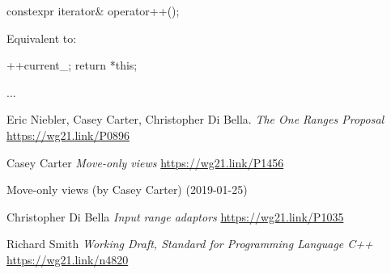 \documentclass{wg21}
\begin{document}
\begin{itemdecl}
	constexpr iterator& operator++();
\end{itemdecl}

\begin{itemdescr}
	\pnum
	\effects Equivalent to:
	\begin{codeblock}
		++current_;
		return *this;
	\end{codeblock}
\end{itemdescr}

...


\begin{thebibliography}{9}
	

	Eric Niebler, Casey Carter, Christopher Di Bella.
	\emph{The One Ranges Proposal}\newline
	\url{https://wg21.link/P0896}
	
	
	Casey Carter
	\emph{ Move-only views}\newline
	\url{https://wg21.link/P1456}
	
	 Move-only views (by Casey Carter) (2019-01-25)

	Christopher Di Bella
	\emph{Input range adaptors}\newline
	\url{https://wg21.link/P1035}
	
	Richard Smith
	\emph{Working Draft, Standard for Programming Language C++}\newline
	\url{https://wg21.link/n4820}
	
	
\end{thebibliography}
\end{document}

